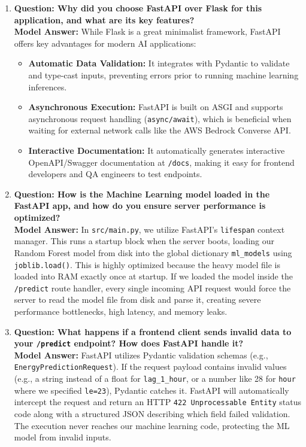 \documentclass[11pt,a4paper]{article}
\begin{document}
\begin{enumerate}[leftmargin=*]
    \item \textbf{Question: Why did you choose FastAPI over Flask for this application, and what are its key features?}
    \\ \textbf{Model Answer:} While Flask is a great minimalist framework, FastAPI offers key advantages for modern AI applications:
    \begin{itemize}
        \item \textbf{Automatic Data Validation:} It integrates with Pydantic to validate and type-cast inputs, preventing errors prior to running machine learning inferences.
        \item \textbf{Asynchronous Execution:} FastAPI is built on ASGI and supports asynchronous request handling (\texttt{async/await}), which is beneficial when waiting for external network calls like the AWS Bedrock Converse API.
        \item \textbf{Interactive Documentation:} It automatically generates interactive OpenAPI/Swagger documentation at \texttt{/docs}, making it easy for frontend developers and QA engineers to test endpoints.
    \end{itemize}

    \item \textbf{Question: How is the Machine Learning model loaded in the FastAPI app, and how do you ensure server performance is optimized?}
    \\ \textbf{Model Answer:} In \texttt{src/main.py}, we utilize FastAPI’s \texttt{lifespan} context manager. This runs a startup block when the server boots, loading our Random Forest model from disk into the global dictionary \texttt{ml\_models} using \texttt{joblib.load()}. 
    This is highly optimized because the heavy model file is loaded into RAM exactly once at startup. If we loaded the model inside the \texttt{/predict} route handler, every single incoming API request would force the server to read the model file from disk and parse it, creating severe performance bottlenecks, high latency, and memory leaks.

    \item \textbf{Question: What happens if a frontend client sends invalid data to your \texttt{/predict} endpoint? How does FastAPI handle it?}
    \\ \textbf{Model Answer:} FastAPI utilizes Pydantic validation schemas (e.g., \texttt{EnergyPredictionRequest}). If the request payload contains invalid values (e.g., a string instead of a float for \texttt{lag\_1\_hour}, or a number like 28 for \texttt{hour} where we specified \texttt{le=23}), Pydantic catches it. FastAPI will automatically intercept the request and return an HTTP \texttt{422 Unprocessable Entity} status code along with a structured JSON describing which field failed validation. The execution never reaches our machine learning code, protecting the ML model from invalid inputs.
\end{enumerate}
\end{document}

